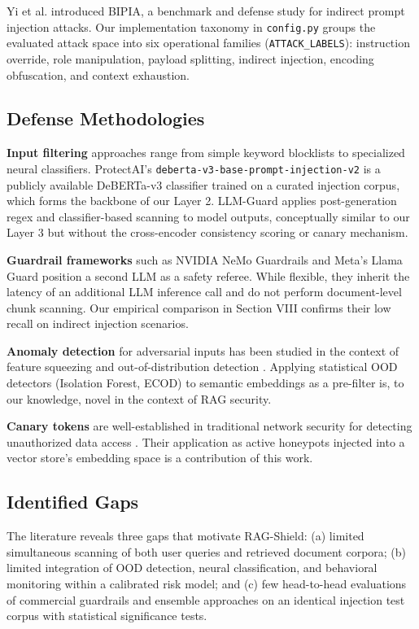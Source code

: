 \documentclass[conference]{IEEEtran}
\begin{document}
Yi et al. \cite{ref5} introduced BIPIA, a benchmark and defense study for indirect prompt injection attacks. Our implementation taxonomy in \texttt{config.py} groups the evaluated attack space into six operational families (\texttt{ATTACK\_LABELS}): instruction override, role manipulation, payload splitting, indirect injection, encoding obfuscation, and context exhaustion.


\subsection{Defense Methodologies}

\textbf{Input filtering} approaches range from simple keyword blocklists to specialized neural classifiers. ProtectAI's \texttt{deberta-v3-base-prompt-injection-v2} \cite{ref6} is a publicly available DeBERTa-v3 classifier trained on a curated injection corpus, which forms the backbone of our Layer 2. LLM-Guard \cite{ref7} applies post-generation regex and classifier-based scanning to model outputs, conceptually similar to our Layer 3 but without the cross-encoder consistency scoring or canary mechanism.


\textbf{Guardrail frameworks} such as NVIDIA NeMo Guardrails \cite{ref8} and Meta's Llama Guard \cite{ref9} position a second LLM as a safety referee. While flexible, they inherit the latency of an additional LLM inference call and do not perform document-level chunk scanning. Our empirical comparison in Section VIII confirms their low recall on indirect injection scenarios.


\textbf{Anomaly detection} for adversarial inputs has been studied in the context of feature squeezing \cite{ref10} and out-of-distribution detection \cite{ref11}. Applying statistical OOD detectors (Isolation Forest, ECOD) to semantic embeddings as a pre-filter is, to our knowledge, novel in the context of RAG security.


\textbf{Canary tokens} are well-established in traditional network security for detecting unauthorized data access \cite{ref12}. Their application as active honeypots injected into a vector store's embedding space is a contribution of this work.


\subsection{Identified Gaps}

The literature reveals three gaps that motivate RAG-Shield: (a) limited simultaneous scanning of both user queries and retrieved document corpora; (b) limited integration of OOD detection, neural classification, and behavioral monitoring within a calibrated risk model; and (c) few head-to-head evaluations of commercial guardrails and ensemble approaches on an identical injection test corpus with statistical significance tests.
\end{document}
